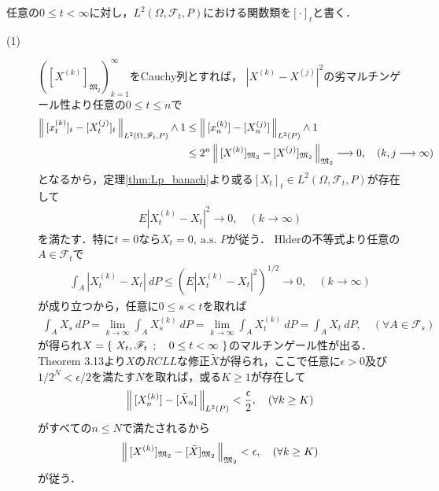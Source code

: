 	\begin{prf} 任意の$0 \leq t < \infty$に対し，$L^2(\Omega,\mathscr{F}_t,P)$における関数類を$[\cdot]_t$と書く．
		\begin{description}
			\item[(1)] $\left([X^{(k)}]_{\mathfrak{M}_2}\right)_{k=1}^\infty$をCauchy列とすれば，
				$|X^{(k)} - X^{(j)}|^2$の劣マルチンゲール性より任意の$0 \leq t \leq n$で
				\begin{align}
					\left\|\, [x^{(k)}_t]_t - [X^{(j)}_t]_t\, \right\|_{L^2(\Omega,\mathscr{F}_t,P)} \wedge 1
					&\leq \left\|\, [x^{(k)}_n] - [X^{(j)}_n]\, \right\|_{L^2(P)} \wedge 1 \\
					&\leq 2^n \left\|\, [X^{(k)}]_{\mathfrak{M}_2} - [X^{(j)}]_{\mathfrak{M}_2}\, \right\|_{\mathfrak{M}_2}
					\longrightarrow 0,
					\quad (k,j \longrightarrow \infty)
				\end{align}
				となるから，定理\ref{thm:Lp_banach}より或る$[X_t]_t \in L^2(\Omega,\mathscr{F}_t,P)$が存在して
				\begin{align}
					E \left|X^{(k)}_t - X_t\right|^2 \longrightarrow 0,
					\quad (k \longrightarrow \infty)
				\end{align}
				を満たす．特に$t = 0$なら$X_t = 0,\ \mbox{a.s. $P$}$が従う．
				Hlderの不等式より任意の$A \in \mathscr{F}_t$で
				\begin{align}
					\int_A \left|X^{(k)}_t - X_t\right|\ dP
					\leq \left( E \left|X^{(k)}_t - X_t\right|^2 \right)^{1/2}
					\longrightarrow 0,
					\quad (k \longrightarrow \infty)
				\end{align}
				が成り立つから，任意に$0 \leq s < t$を取れば
				\begin{align}
					\int_A X_s\ dP
					= \lim_{k \to \infty} \int_A X^{(k)}_s\ dP
					= \lim_{k \to \infty} \int_A X^{(k)}_t\ dP
					= \int_A X_t\ dP,
					\quad (\forall A \in \mathscr{F}_s)
				\end{align}
				が得られ$X = \left\{\ X_t,\mathscr{F}_t\ \, ; \quad 0 \leq t < \infty\ \right\}$のマルチンゲール性が出る．
				Theorem 3.13より$X$の$RCLL$な修正$\tilde{X}$が得られ，ここで任意に$\epsilon > 0$及び
				$1/2^N < \epsilon/2$を満たす$N$を取れば，或る$K \geq 1$が存在して
				\begin{align}
					\left\|\, [X^{(k)}_n] - [\tilde{X}_n]\, \right\|_{L^2(P)} < \frac{\epsilon}{2},
					\quad (\forall k \geq K)
				\end{align}
				がすべての$n \leq N$で満たされるから
				\begin{align}
					\left\|\, [X^{(k)}]_{\mathfrak{M}_2} - [\tilde{X}]_{\mathfrak{M}_2}\, \right\|_{\mathfrak{M}_2} < \epsilon,
					\quad (\forall k \geq K)
				\end{align}
				が従う．
		\end{description}
	\end{prf}
